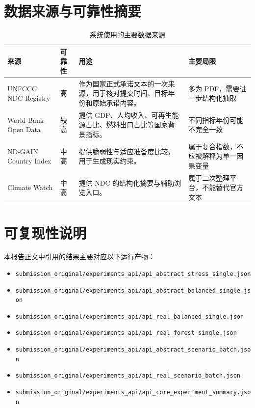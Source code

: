 \documentclass[12pt,a4paper]{ctexart}
\begin{document}
\section{数据来源与可靠性摘要}
\begin{table}[H]
\centering
\caption{系统使用的主要数据来源}
\label{tab:sources}
\begin{tabularx}{\textwidth}{>{\raggedright\arraybackslash}p{3cm} >{\raggedright\arraybackslash}p{1.8cm} >{\raggedright\arraybackslash}X >{\raggedright\arraybackslash}p{3.2cm}}
\toprule
来源 & 可靠性 & 用途 & 主要局限 \\
\midrule
UNFCCC NDC Registry & 高 & 作为国家正式承诺文本的一次来源，用于核对提交时间、目标年份和原始承诺内容。 & 多为 PDF，需要进一步结构化抽取 \\
World Bank Open Data & 较高 & 提供 GDP、人均收入、可再生能源占比、燃料出口占比等国家背景指标。 & 不同指标年份可能不完全一致 \\
ND-GAIN Country Index & 中高 & 提供脆弱性与适应准备度比较，用于生成现实约束。 & 属于复合指数，不应被解释为单一因果变量 \\
Climate Watch & 中高 & 提供 NDC 的结构化摘要与辅助浏览入口。 & 属于二次整理平台，不能替代官方文本 \\
\bottomrule
\end{tabularx}
\end{table}

\section{可复现性说明}
本报告正文中引用的结果主要对应以下运行产物：
\begin{itemize}
  \item \texttt{submission\_original/experiments\_api/api\_abstract\_stress\_single.json}
  \item \texttt{submission\_original/experiments\_api/api\_abstract\_balanced\_single.json}
  \item \texttt{submission\_original/experiments\_api/api\_real\_balanced\_single.json}
  \item \texttt{submission\_original/experiments\_api/api\_real\_forest\_single.json}
  \item \texttt{submission\_original/experiments\_api/api\_abstract\_scenario\_batch.json}
  \item \texttt{submission\_original/experiments\_api/api\_real\_scenario\_batch.json}
  \item \texttt{submission\_original/experiments\_api/api\_core\_experiment\_summary.json}
\end{itemize}
\end{document}
